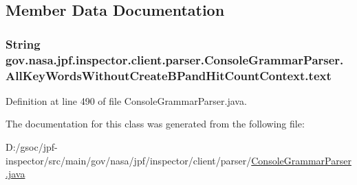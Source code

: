 \subsection{Member Data Documentation}
\subsubsection[{\texorpdfstring{text}{text}}]{\setlength{\rightskip}{0pt plus 5cm}String gov.\+nasa.\+jpf.\+inspector.\+client.\+parser.\+Console\+Grammar\+Parser.\+All\+Key\+Words\+Without\+Create\+B\+Pand\+Hit\+Count\+Context.\+text}\hypertarget{classgov_1_1nasa_1_1jpf_1_1inspector_1_1client_1_1parser_1_1_console_grammar_parser_1_1_all_key_5423188b2439879f44801649cdee10f6_afe020969de428e2a8bc01f5cef384bc5}{}\label{classgov_1_1nasa_1_1jpf_1_1inspector_1_1client_1_1parser_1_1_console_grammar_parser_1_1_all_key_5423188b2439879f44801649cdee10f6_afe020969de428e2a8bc01f5cef384bc5}


Definition at line 490 of file Console\+Grammar\+Parser.\+java.



The documentation for this class was generated from the following file\+:\begin{DoxyCompactItemize}
\item 
D\+:/gsoc/jpf-\/inspector/src/main/gov/nasa/jpf/inspector/client/parser/\hyperlink{_console_grammar_parser_8java}{Console\+Grammar\+Parser.\+java}\end{DoxyCompactItemize}
